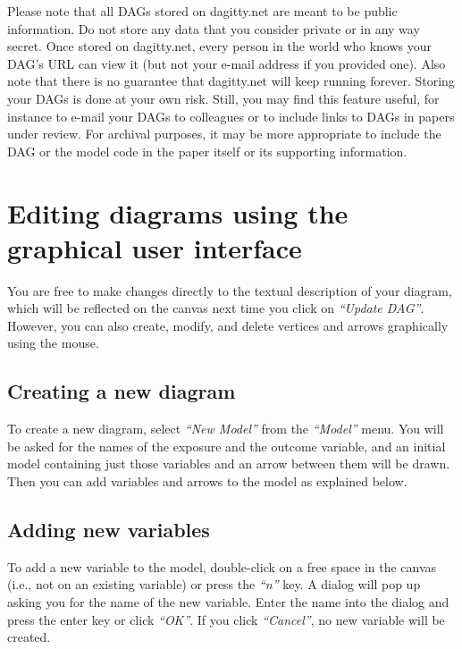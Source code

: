 \documentclass[a4paper,10pt]{article}
\newcommand{\action}[1]{\emph{``#1''}}
\begin{document}
Please note that all DAGs stored on dagitty.net are meant to be public information.
Do not store any data that you consider private or in any way secret.
Once stored on dagitty.net, every person in the world who knows your DAG's URL
can view it (but not your e-mail address if you provided one). Also note that there is
no guarantee that dagitty.net will keep running forever. Storing your DAGs is done at
your own risk. Still, you may find this feature useful, for instance to e-mail your DAGs
to colleagues or to include links to DAGs in papers under review. For archival
purposes, it may be more appropriate to include the DAG or the model code in
the paper itself or its supporting information.

\section{Editing diagrams using the graphical user interface} 

\label{sec:diagramediting}

You are free to make changes directly to the textual description of your
diagram, which will be reflected on the canvas next time you click on \action{Update DAG}.
However, you can also create, modify, and delete vertices and arrows graphically
using the mouse.

\subsection{Creating a new diagram}

To create a new diagram, select \action{New Model} from the \action{Model} menu.
You will be asked
for the names of the exposure and the outcome variable, and an initial model containing
just those variables and an arrow between them will be drawn. Then you can
add variables and arrows to the model as explained below. 

\subsection{Adding new variables}

To add a new variable to the model, double-click on a free space in the canvas
(i.e., not on an existing variable) or press the \action{n} key. A dialog will
pop up asking you for the name of the new variable. Enter the name into the dialog
and press the enter key or click \action{OK}. If you click \action{Cancel}, no new 
variable will be created.
\end{document}
